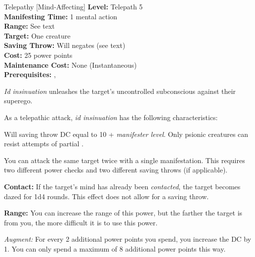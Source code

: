 {Telepathy [Mind-Affecting]}
{
	\textbf{Level:}
	Telepath 5\\
	\textbf{Manifesting Time:}
	1 mental action\\
	\textbf{Range:}
	See text\\
	\textbf{Target:}
	One creature\\
	\textbf{Saving Throw:}
	Will negates (see text)\\
	\textbf{Cost:}
	25 power points\\
	\textbf{Maintenance Cost:}
	None (Instantaneous)\\
	\textbf{Prerequisites:}
	, \\
}
{
	\emph{Id insinuation} unleashes the target's uncontrolled subconscious against their superego.

	As a telepathic attack, \emph{id insinuation} has the following characteristics:
	\begin{itemize*}
		\item Will saving throw DC equal to 10 + \textit{manifester level}. Only psionic creatures can resist attempts of partial .
		\item You can attack the same target twice with a single manifestation. This requires two different power checks and two different saving throws (if applicable).
	\end{itemize*}

	\textbf{Contact:} If the target's mind has already been \emph{contacted}, the target becomes dazed for 1d4 rounds. This effect does not allow for a saving throw.
	
	\textbf{Range:} You can increase the range of this power, but the farther the target is from you, the more difficult it is to use this power.


	\textit{Augment:} For every 2 additional power points you spend, you increase the DC by 1. You can only spend a maximum of 8 additional power points this way.
}
